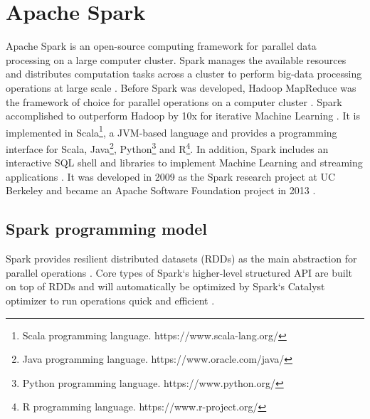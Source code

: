 \section{Apache Spark}
Apache Spark is an open-source computing framework for parallel data processing on a large computer cluster. Spark manages the available resources and distributes computation tasks across a cluster to perform big-data processing operations at large scale \cite{Chambers2018Spark}. Before Spark was developed, Hadoop MapReduce \cite{Dean2010MapReduce} was the framework of choice for parallel operations on a computer cluster \cite{Zaharia2010Spark}. Spark accomplished to outperform Hadoop by 10x for iterative Machine Learning \cite{Zaharia2010Spark}. It is implemented in Scala\footnote{Scala programming language. https://www.scala-lang.org/}, a JVM-based language and provides a programming interface for Scala, Java\footnote{Java programming language. https://www.oracle.com/java/}, Python\footnote{Python programming language. https://www.python.org/} and R\footnote{R programming language. https://www.r-project.org/}. In addition, Spark includes an interactive SQL shell and libraries to implement Machine Learning and streaming applications \cite{Chambers2018Spark}.
It was developed in 2009 as the Spark research project at UC Berkeley and became an Apache Software Foundation project in 2013 \cite{Chambers2018Spark}. 


\subsection{Spark programming model}
\label{sec:spark_programming_model}
Spark provides resilient distributed datasets (RDDs) as the main abstraction for parallel operations \cite{Zaharia2010Spark}. Core types of Spark`s higher-level structured API are built on top of RDDs \cite{Chambers2018Spark} and will automatically be optimized by Spark`s Catalyst optimizer to run operations quick and efficient \cite{Hien2018Spark}.


